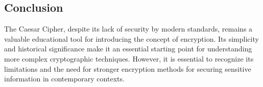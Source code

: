 \documentclass[a4,10pt]{article}
\begin{document}
\subsection{Conclusion}
The Caesar Cipher, despite its lack of security by modern standards, remains a valuable educational tool for introducing the concept of encryption. Its simplicity and historical significance make it an essential starting point for understanding more complex cryptographic techniques. However, it is essential to recognize its limitations and the need for stronger encryption methods for securing sensitive information in contemporary contexts.

\printbibliography
\end{document}
